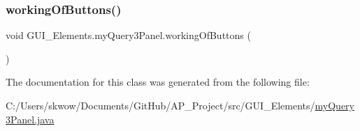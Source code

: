 \hypertarget{class_g_u_i___elements_1_1my_query3_panel_a09bd68ef59c9ffadd8e72abf72186533}{}\label{class_g_u_i___elements_1_1my_query3_panel_a09bd68ef59c9ffadd8e72abf72186533} 
\subsubsection{\texorpdfstring{working\+Of\+Buttons()}{workingOfButtons()}}
{\footnotesize\ttfamily void G\+U\+I\+\_\+\+Elements.\+my\+Query3\+Panel.\+working\+Of\+Buttons (\begin{DoxyParamCaption}{ }\end{DoxyParamCaption})}



The documentation for this class was generated from the following file\+:\begin{DoxyCompactItemize}
\item 
C\+:/\+Users/skwow/\+Documents/\+Git\+Hub/\+A\+P\+\_\+\+Project/src/\+G\+U\+I\+\_\+\+Elements/\hyperlink{my_query3_panel_8java}{my\+Query3\+Panel.\+java}\end{DoxyCompactItemize}
